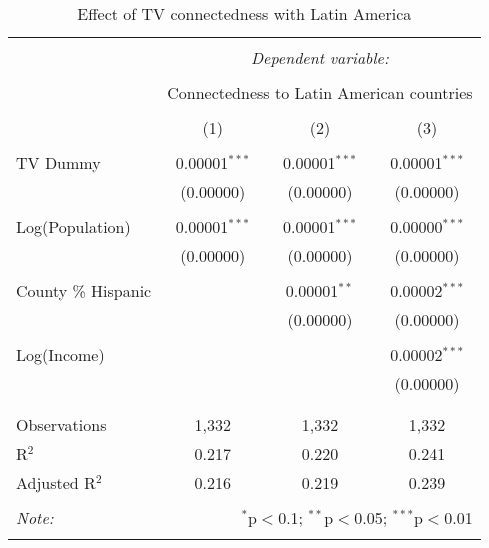 
\begin{table}[!htbp] \centering 
  \caption{Effect of TV connectedness with Latin America} 
  \label{} 
\begin{tabular}{@{\extracolsep{-5pt}}lccc} 
\\[-1.8ex]\hline 
\hline \\[-1.8ex] 
 & \multicolumn{3}{c}{\textit{Dependent variable:}} \\ 
\cline{2-4} 
\\[-1.8ex] & \multicolumn{3}{c}{Connectedness to Latin American countries} \\ 
\\[-1.8ex] & (1) & (2) & (3)\\ 
\hline \\[-1.8ex] 
 TV Dummy & 0.00001$^{***}$ & 0.00001$^{***}$ & 0.00001$^{***}$ \\ 
  & (0.00000) & (0.00000) & (0.00000) \\ 
  & & & \\ 
 Log(Population) & 0.00001$^{***}$ & 0.00001$^{***}$ & 0.00000$^{***}$ \\ 
  & (0.00000) & (0.00000) & (0.00000) \\ 
  & & & \\ 
 County \% Hispanic &  & 0.00001$^{**}$ & 0.00002$^{***}$ \\ 
  &  & (0.00000) & (0.00000) \\ 
  & & & \\ 
 Log(Income) &  &  & 0.00002$^{***}$ \\ 
  &  &  & (0.00000) \\ 
  & & & \\ 
\hline \\[-1.8ex] 
Observations & 1,332 & 1,332 & 1,332 \\ 
R$^{2}$ & 0.217 & 0.220 & 0.241 \\ 
Adjusted R$^{2}$ & 0.216 & 0.219 & 0.239 \\ 
\hline 
\hline \\[-1.8ex] 
\textit{Note:}  & \multicolumn{3}{r}{$^{*}$p$<$0.1; $^{**}$p$<$0.05; $^{***}$p$<$0.01} \\ 
 & \multicolumn{3}{r}{} \\ 
\end{tabular} 
\end{table} 
